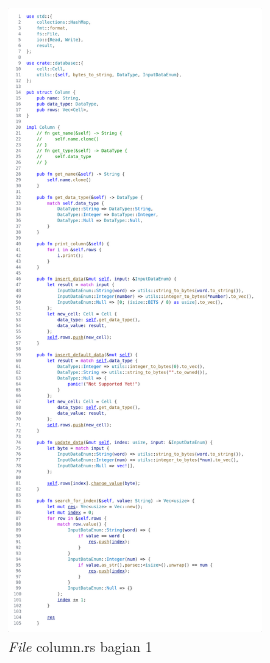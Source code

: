 \begin{figure}[H]
  \centering{}
	\includegraphics[width=0.6\textwidth]{gambar/lampiran/file-column-1.png}
  \caption{\emph{File} column.rs bagian 1}
\end{figure}

